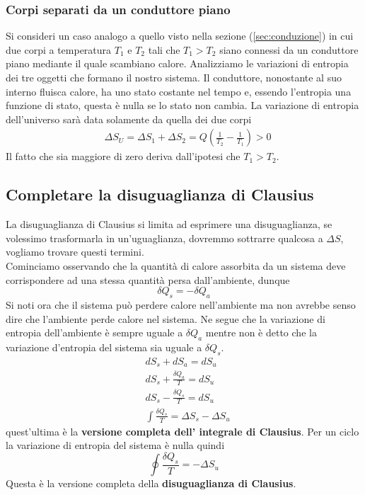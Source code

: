 \documentclass[10pt,a4paper]{article}
\begin{document}
\subsubsection{Corpi separati da un conduttore piano}
Si consideri un caso analogo a quello visto nella sezione (\ref{sec:conduzione}) in cui due corpi a temperatura \(T_1\) e \(T_2\) tali che \(T_1 > T_2\) siano connessi da un conduttore piano mediante il quale scambiano calore. Analizziamo le variazioni di entropia dei tre oggetti che formano il nostro sistema. Il conduttore, nonostante al suo interno fluisca calore, ha uno stato costante nel tempo e, essendo l'entropia una funzione di stato, questa è nulla se lo stato non cambia. La variazione di entropia dell'universo sarà data solamente da quella dei due corpi 
\begin{align*}
	&\Delta S_U = \Delta S_1 + \Delta S_2 = Q\left(\frac{1}{T_2}-\frac{1}{T_1}\right)>0
\end{align*}
Il fatto che sia maggiore di zero deriva dall'ipotesi che \(T_1 > T_2\).

\subsection{Completare la disuguaglianza di Clausius}
La disuguaglianza di Clausius si limita ad esprimere una disuguaglianza, se volessimo trasformarla in un'uguaglianza, dovremmo sottrarre qualcosa a \(\Delta S\), vogliamo trovare questi termini.\\
Cominciamo osservando che la quantità di calore assorbita da un sistema deve corrispondere ad una stessa quantità persa dall'ambiente, dunque
\[\delta Q_s = -\delta Q_a\]
Si noti ora che il sistema può perdere calore nell'ambiente ma non avrebbe senso dire che l'ambiente perde calore nel sistema. Ne segue che la variazione di entropia dell'ambiente è sempre uguale a \(\delta Q_a\) mentre non è detto che la variazione d'entropia del sistema sia uguale a \(\delta Q_s\). 
\begin{align*}
	&dS_s + dS_a = dS_u\\
	&dS_s + \frac{\delta Q_a}{T} = dS_u\\
	&dS_s - \frac{\delta Q_s}{T} =dS_u\\
	&\int\frac{\delta Q_s}{T} = \Delta S_s - \Delta S_u
\end{align*}
quest'ultima è la \textbf{versione completa dell' integrale di Clausius}. Per un ciclo la variazione di entropia del sistema è nulla quindi
\[\oint \frac{\delta Q_s}{T} = -\Delta S_u\]
Questa è la versione completa della \textbf{disuguaglianza di Clausius}.
\end{document}
